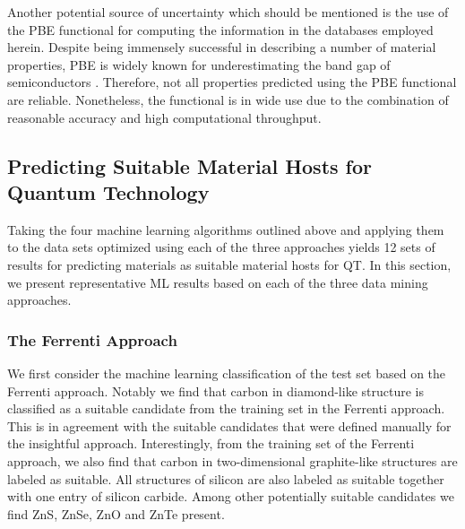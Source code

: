 \documentclass[superscriptaddress,unsortedaddress,
 amsmath,amssymb,
 aps,
]{revtex4-2}
\begin{document}
Another potential source of uncertainty which should be mentioned is the use of the PBE functional for computing the information in the databases employed herein. Despite being immensely successful in describing a number of material properties, PBE is widely known for underestimating the band gap of semiconductors \cite{Freysoldt2014}. Therefore, not all properties predicted using the PBE functional are reliable. Nonetheless, the functional is in wide use due to the combination of reasonable accuracy and high computational throughput. 

\subsection*{Predicting Suitable Material Hosts for Quantum Technology}

Taking the four machine learning algorithms outlined above and applying them to the data sets optimized using each of the three approaches yields 12 sets of results for predicting  materials as suitable material hosts for QT. In this section, we present representative ML results based on each of the three data mining approaches. 

\subsubsection*{The Ferrenti Approach}
We first consider the machine learning classification of the test set based on the Ferrenti approach. 
Notably we find that carbon in diamond-like structure is classified as a suitable candidate from the training set in the Ferrenti approach. 
This is in agreement with the suitable candidates that were defined manually for the insightful approach. 
Interestingly, from the training set of the Ferrenti approach, we also find that carbon in two-dimensional graphite-like structures are labeled as suitable. 
All structures of silicon are also labeled as suitable together with one entry of silicon carbide. 
Among other potentially suitable candidates we find ZnS, ZnSe, ZnO and ZnTe present. 

%
% 
%
\end{document}
